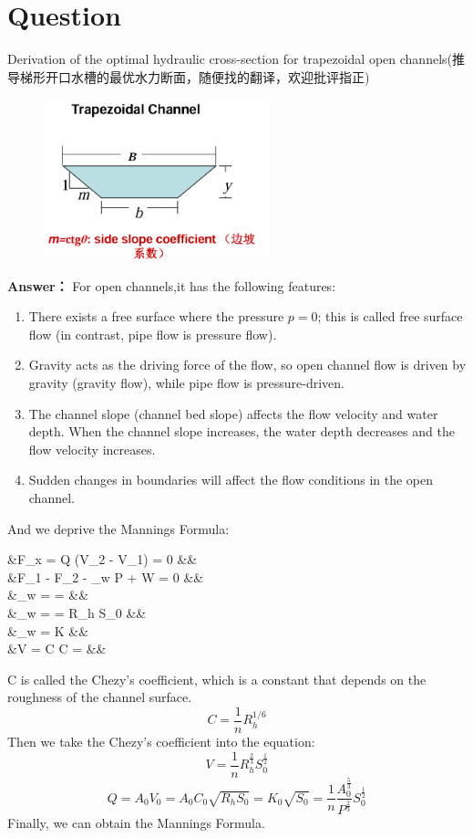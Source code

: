 \documentclass[12pt,a4paper]{article}
\newcounter{question}
\newenvironment{questions}{
    \setcounter{question}{0}
    \section*{Question}
    \begin{enumerate}[leftmargin=1.5em,label={\arabic*．}]
}{
    \end{enumerate}
}
\newcommand{\answer}[1]{\par\noindent\textbf{Answer：} #1\par\vspace{1em}}
\begin{document}
\begin{questions}
{\item Derivation of the optimal hydraulic cross-section for trapezoidal open channels(推导梯形开口水槽的最优水力断面，随便找的翻译，欢迎批评指正)

\begin{figure}[H]
\centering
\includegraphics[width=0.6\textwidth]{./figures/27.png}
\end{figure}

\answer{
For open channels,it has the following features:

\begin{enumerate}
  \item There exists a free surface where the pressure $p=0$; this is called free surface flow (in contrast, pipe flow is pressure flow).

  \item Gravity acts as the driving force of the flow, so open channel flow is driven by gravity (gravity flow), while pipe flow is pressure-driven.

  \item The channel slope (channel bed slope) affects the flow velocity and water depth. When the channel slope increases, the water depth decreases and the flow velocity increases.

  \item Sudden changes in boundaries will affect the flow conditions in the open channel.
\end{enumerate}

And we deprive the Mannings Formula:
\begin{flalign*}
  &\sum F_x = \rho Q (V_2 - V_1) = 0 &&\\
  &F_1 - F_2 - \tau_w P \ell + W \sin \theta = 0 &&\\
  &\tau_w = \frac{W \sin \theta}{P \ell} = \frac{W S_0}{P \ell} &&\\
  &\tau_w = \frac{\gamma A \ell S_0}{P \ell} = \gamma R_h S_0 &&\\
  &\tau_w = K \rho \frac{V^2}{2} &&\\
  &V = C \sqrt{R_h S_0} \quad
  C = \sqrt{\frac{2g}{K}} &&
\end{flalign*}
C is called the Chezy's coefficient, which is a constant that depends on the roughness of the channel surface.
$$C = \frac{1}{n} R_h^{1/6}$$
Then we take the Chezy's coefficient into the equation:
\[
V = \frac{1}{n} R_h^{\frac{2}{3}} S_0^{\frac{1}{2}}
\]
\[
Q = A_0 V_0 = A_0 C_0 \sqrt{R_h S_0} = K_0 \sqrt{S_0} = \frac{1}{n} \frac{A_0^{\frac{5}{3}}}{P^{\frac{2}{3}}} S_0^{\frac{1}{2}}
\]
Finally, we can obtain the Mannings Formula.

}}
\end{questions}
\end{document}
